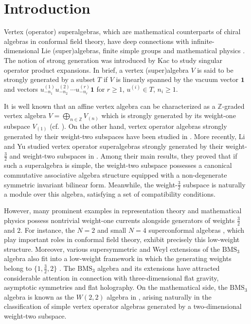 \documentclass[12pt]{article}
\numberwithin{equation}{section}
\theoremstyle{definition}
\theoremstyle{plain}
\newcommand{\bZ}{\ensuremath{\mathbb{Z}}}
\newcommand{\bone}{\mathbf{1 }}
\begin{document}
\section{Introduction}\label{sect:intro}
\hspace{1.5em}Vertex (operator) superalgebras, which are mathematical counterparts of chiral algebras in conformal field theory, have deep connections with infinite-dimensional Lie (super)algebras, finite simple groups and mathematical physics \cite{B,FB,FHL,K98,Li,T,Xu}. The notion of strong generation was introduced by Kac \cite{K98} to study singular operator product expansions. In brief, a vertex (super)algebra $V$ is said to be strongly generated by a subset $T$ if $V$ is linearly spanned by the vacuum vector $\bone$ and vectors $u_{-n_1}^{(1)}u_{-n_2}^{(2)}\cdots u_{-n_r}^{(r)}\bone$ for $r\ge 1$, $u^{(i)}\in T$, $n_i\ge1$.

It is well known that an affine vertex algebra can be characterized as a $\bZ$-graded vertex algebra $V=\bigoplus_{n\in\bZ}V_{(n)}$ which is strongly generated by its weight-one subspace $V_{(1)}$ (cf. \cite{FZ,Lian}). On the other hand, vertex operator algebras strongly generated by their weight-two subspaces have been studied in \cite{Lam,P}. More recently, Li and Yu studied vertex operator superalgebras strongly generated by their weight-$\frac{3}{2}$ and weight-two subspaces in \cite{LY}. Among their main results, they proved that if such a superalgebra is simple, the weight-two subspace possesses a canonical commutative associative algebra structure equipped with a non-degenerate symmetric invariant bilinear form. Meanwhile, the weight-$\frac{3}{2}$ subspace is naturally a module over this algebra, satisfying a set of compatibility conditions.

However, many prominent examples in representation theory and mathematical physics possess nontrivial weight-one currents alongside generators of weights $\frac{3}{2}$ and $2$. For instance, the $N=2$ and small $N=4$ superconformal algebras \cite{K98,KPP,KW}, which play important roles in conformal field theory, exhibit precisely this low-weight structure. Moreover, various supersymmetric and Weyl extensions of the $\mathrm{BMS}_3$ algebra also fit into a low-weight framework in which the generating weights belong to $\{1,\frac{3}{2},2\}$ \cite{AST,O,Man}. The $\mathrm{BMS}_3$ algebra and its extensions have attracted considerable attention in connection with three-dimensional flat gravity, asymptotic symmetries and flat holography. On the mathematical side, the $\mathrm{BMS}_3$ algebra is known as the $W(2,2)$ algebra in \cite{ZD}, arising naturally in the classification of simple vertex operator algebras generated by a two-dimensional weight-two subspace.
\end{document}
